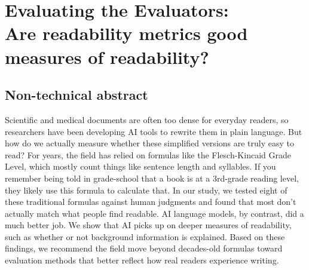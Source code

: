 \chapter{Evaluating the Evaluators:\\Are readability metrics good measures of readability?} \label{chap:chap-5}




\section*{Non-technical abstract}
    Scientific and medical documents are often too dense for everyday readers, so researchers have been developing AI tools to rewrite them in plain language. But how do we actually measure whether these simplified versions are truly easy to read? For years, the field has relied on formulas like the Flesch-Kincaid Grade Level, which mostly count things like sentence length and syllables. If you remember being told in grade-school that a book is at a 3rd-grade reading level, they likely use this formula to calculate that. In our study, we tested eight of these traditional formulas against human judgments and found that most don't actually match what people find readable. AI language models, by contrast, did a much better job. We show that AI picks up on deeper measures of readability, such as whether or not background information is explained. Based on these findings, we recommend the field move beyond decades-old formulas toward evaluation methods that better reflect how real readers experience writing.







